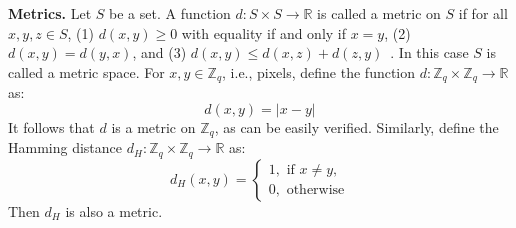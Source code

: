 \documentclass[pdflatex,sn-mathphys-num]{sn-jnl}
\newcommand{\descr}[1]{\vspace{0.2cm} \noindent \textbf{#1}}
\theoremstyle{definition}
\begin{document}
\descr{Metrics.} Let $S$ be a set. A function $d: S \times S \rightarrow \mathbb{R}$ is called a metric on $S$ if for all $x, y, z \in S$, (1) $d (x, y) \ge 0$ with equality if and only if $x = y$, (2) $d(x, y) = d(y, x)$, and (3) $d(x, y) \leq d(x, z) + d(z, y)$~\cite{searcoid-metric}. In this case $S$ is called a metric space. 
For $x, y \in \mathbb{Z}_q$, i.e., pixels, define the function $d: \mathbb{Z}_q \times \mathbb{Z}_q \rightarrow \mathbb{R}$ as: 
\begin{equation}
\label{eq:d}
d(x, y) = |x - y |
\end{equation}
It follows that $d$ is a metric on $\mathbb{Z}_q$, as can be easily verified.  
Similarly, define the Hamming distance $d_H: \mathbb{Z}_q \times \mathbb{Z}_q \rightarrow \mathbb{R}$ as: 
\begin{equation}
    d_H(x, y) = \begin{cases}
        1, \text{ if } x \neq y, \\
        0, \text{ otherwise}
    \end{cases}
\end{equation}
Then $d_H$ is also a metric. 
\end{document}

